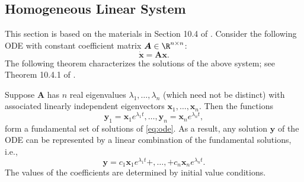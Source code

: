 

\subsection{Homogeneous Linear System}
This section is based on the materials in Section 10.4 of \cite{trench2013elementary}.
Consider the following ODE with constant coefficient matrix $\bm{A} \in \R^{n \times n}$:
    \begin{equation}\label{eq:ode}
        \dot{\bm{x}} = \bm{A} \bm{x}.
    \end{equation}
The following theorem characterizes the solutions of the above system; see Theorem 10.4.1 of \cite{trench2013elementary}.
\begin{theorem}
    Suppose $\bm{A}$ has $n$ real eigenvalues $\lambda_1, \ldots, \lambda_n$ (which need not be distinct) with associated linearly independent eigenvectors $\bm{x}_1, \ldots, \bm{x}_n$.
    Then the functions
        \begin{equation}
            \bm{y}_1 = \bm{x}_1 e^{\lambda_1 t}, \ldots, \bm{y}_n = \bm{x}_n e^{\lambda_n t},
        \end{equation}
    form a fundamental set of solutions of \eqref{eq:ode}.
    As a result, any solution $\bm{y}$ of the ODE can be represented by a linear combination of the fundamental solutions, i.e., 
        \begin{equation}
            \bm{y} = c_1 \bm{x}_1 e^{\lambda_1 t} + , \ldots, + c_n \bm{x}_n e^{\lambda_n t}.
        \end{equation}
    The values of the coefficients are determined by initial value conditions.
    
\end{theorem}